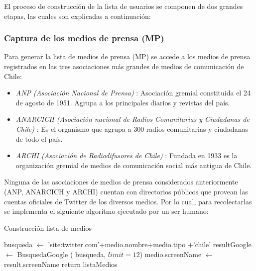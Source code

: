 El proceso de construcción de la lista de usuarios se componen de dos grandes etapas, las cuales son explicadas a continuación:



\subsubsection{Captura de los medios de prensa (MP)}

Para generar la lista de medios de prensa (MP) se accede a los medios de prensa registrados en las tres asociaciones más grandes de medios de comunicación de Chile:
\begin{itemize}
	\item \textit{ANP (Asociación Nacional de Prensa)} \cite{anpWebsite}: Asociación gremial constituida el 24 de agosto de 1951. Agrupa a los principales diarios y revistas del país.
	\item \textit{ANARCICH (Asociación nacional de Radios Comunitarias y Ciudadanas de Chile)} \cite{anarcichWebsite}: Es el organismo que agrupa a 300 radios comunitarias y ciudadanas de todo el país. 
	\item \textit{ARCHI (Asociación de Radiodifusores de Chile)} \cite{archiWebsite}: Fundada en 1933 es la organización gremial de medios de comunicación social más antigua de Chile.
\end{itemize}	

Ninguna de las asociaciones de medios de prensa considerados anteriormente (ANP, ANARCICH y ARCHI) cuentan con directorios públicos \cite{mediosArchi} \cite{mediosaAnp} \cite{mediosAnarcich} que provean las cuentas oficiales de Twitter de los diversos medios. Por lo cual, para recolectarlas se implementa el siguiente algoritmo ejecutado por un ser humano:

\begin{algorithm}[H]
	\caption{Construcción lista de medios}\label{mediosPrensa}
	\begin{algorithmic}[1]
		\State busqueda $\gets$ 'site:twitter.com'+medio.nombre+medio.tipo +'chile'
		\State resultGoogle $\gets$ BusquedaGoogle ( busqueda, $limit=12$)
		\State medio.screenName $\gets$ result.screenName
		\EndIf 
		\EndFor
		\EndFor
		\State return listaMedios
		\EndFunction	
	\end{algorithmic}
\end{algorithm}

